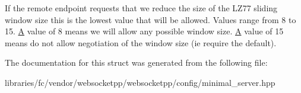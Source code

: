 If the remote endpoint requests that we reduce the size of the L\+Z77 sliding window size this is the lowest value that will be allowed. Values range from 8 to 15. \mbox{\hyperlink{struct_a}{A}} value of 8 means we will allow any possible window size. \mbox{\hyperlink{struct_a}{A}} value of 15 means do not allow negotiation of the window size (ie require the default). 

The documentation for this struct was generated from the following file\+:\begin{DoxyCompactItemize}
\item 
libraries/fc/vendor/websocketpp/websocketpp/config/minimal\+\_\+server.\+hpp\end{DoxyCompactItemize}
